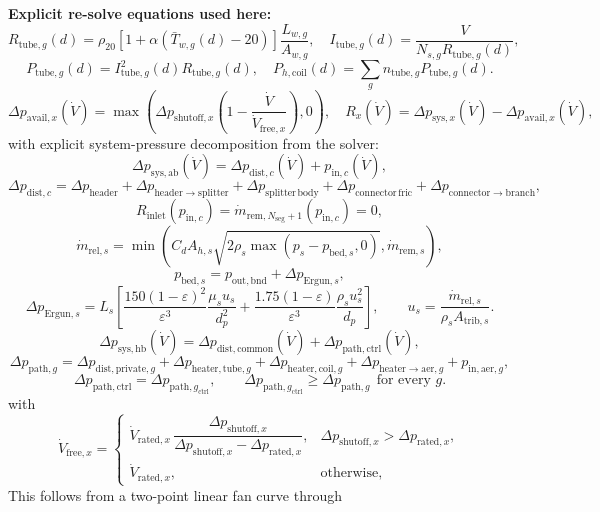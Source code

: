 \documentclass[11pt]{article}
\begin{document}
\textbf{Explicit re-solve equations used here:}
\[
R_{\mathrm{tube},g}(d)=\rho_{20}\!\left[1+\alpha\!\left(\bar T_{w,g}(d)-20\right)\right]\frac{L_{w,g}}{A_{w,g}},\quad
I_{\mathrm{tube},g}(d)=\frac{V}{N_{s,g}R_{\mathrm{tube},g}(d)},
\]
\[
P_{\mathrm{tube},g}(d)=I_{\mathrm{tube},g}^2(d)R_{\mathrm{tube},g}(d),\quad
P_{h,\mathrm{coil}}(d)=\sum_g n_{\mathrm{tube},g}P_{\mathrm{tube},g}(d).
\]
\[
\Delta p_{\mathrm{avail},x}(\dot V)=\max\!\left(\Delta p_{\mathrm{shutoff},x}\left(1-\frac{\dot V}{\dot V_{\mathrm{free},x}}\right),0\right),\quad
R_x(\dot V)=\Delta p_{\mathrm{sys},x}(\dot V)-\Delta p_{\mathrm{avail},x}(\dot V),
\]
with explicit system-pressure decomposition from the solver:
\[
\Delta p_{\mathrm{sys},\mathrm{ab}}(\dot V)=\Delta p_{\mathrm{dist},c}(\dot V)+p_{\mathrm{in},c}(\dot V),
\]
\[
\Delta p_{\mathrm{dist},c}
=
\Delta p_{\mathrm{header}}
+\Delta p_{\mathrm{header\rightarrow splitter}}
+\Delta p_{\mathrm{splitter\,body}}
+\Delta p_{\mathrm{connector\,fric}}
+\Delta p_{\mathrm{connector\rightarrow branch}},
\]
\[
R_{\mathrm{inlet}}(p_{\mathrm{in},c})
=
\dot m_{\mathrm{rem},N_{\mathrm{seg}}+1}(p_{\mathrm{in},c})
=0,
\]
\[
\dot m_{\mathrm{rel},s}
=
\min\!\left(
C_dA_{h,s}\sqrt{2\rho_s\max(p_s-p_{\mathrm{bed},s},0)},
\dot m_{\mathrm{rem},s}
\right),
\]
\[
p_{\mathrm{bed},s}=p_{\mathrm{out,bnd}}+\Delta p_{\mathrm{Ergun},s},
\]
\[
\Delta p_{\mathrm{Ergun},s}
=
L_s\!\left[
\frac{150(1-\varepsilon)^2}{\varepsilon^3}\frac{\mu_su_s}{d_p^2}
+
\frac{1.75(1-\varepsilon)}{\varepsilon^3}\frac{\rho_su_s^2}{d_p}
\right],
\qquad
u_s=\frac{\dot m_{\mathrm{rel},s}}{\rho_sA_{\mathrm{trib},s}}.
\]
\[
\Delta p_{\mathrm{sys},\mathrm{hb}}(\dot V)
=
\Delta p_{\mathrm{dist,common}}(\dot V)
+
\Delta p_{\mathrm{path,ctrl}}(\dot V),
\]
\[
\Delta p_{\mathrm{path},g}
=
\Delta p_{\mathrm{dist,private},g}
+
\Delta p_{\mathrm{heater,tube},g}
+
\Delta p_{\mathrm{heater,coil},g}
+
\Delta p_{\mathrm{heater\rightarrow aer},g}
+
p_{\mathrm{in,aer},g},
\]
\[
\Delta p_{\mathrm{path,ctrl}}=\Delta p_{\mathrm{path},g_{\mathrm{ctrl}}},
\qquad
\Delta p_{\mathrm{path},g_{\mathrm{ctrl}}}\ge \Delta p_{\mathrm{path},g}\ \ \text{for every }g.
\]
with
\[
\dot V_{\mathrm{free},x}=
\begin{cases}
\dot V_{\mathrm{rated},x}\,\dfrac{\Delta p_{\mathrm{shutoff},x}}{\Delta p_{\mathrm{shutoff},x}-\Delta p_{\mathrm{rated},x}}, & \Delta p_{\mathrm{shutoff},x}>\Delta p_{\mathrm{rated},x},\\[8pt]
\dot V_{\mathrm{rated},x}, & \text{otherwise},
\end{cases}
\]
This follows from a two-point linear fan curve through
\end{document}
